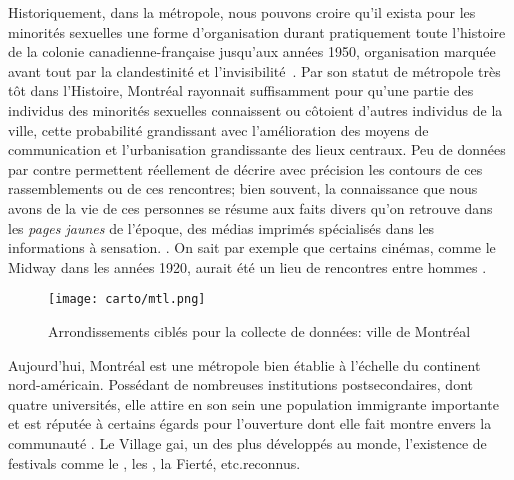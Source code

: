 Historiquement, dans la métropole, nous pouvons croire qu'il exista pour les minorités sexuelles une forme d'organisation durant pratiquement toute l'histoire de la colonie canadienne-française jusqu’aux années 1950, organisation marquée avant tout par la clandestinité et l'invisibilité~\citep{Higgins1999}. 
Par son statut de métropole très tôt dans l'Histoire, Montréal rayonnait suffisamment pour qu'une partie des individus des minorités sexuelles connaissent ou côtoient d'autres individus de la ville, cette probabilité grandissant avec l'amélioration des moyens de communication et l'urbanisation grandissante des lieux centraux. 
Peu de données par contre permettent réellement de décrire avec précision les contours de ces rassemblements ou de ces rencontres; bien souvent, la connaissance que nous avons de la vie de ces personnes se résume aux faits divers qu'on retrouve dans les \emph{pages jaunes} de l'époque, des médias imprimés spécialisés dans les informations à sensation. 
\citep[]{Higgins1999}. 
On sait par exemple que certains cinémas, comme le Midway dans les années 1920, aurait été un lieu de rencontres entre hommes\citep[30]{Higgins1999} .
\begin{figure}[ht]
	\centering
	\texttt{[image: carto/mtl.png]}
	\caption{Arrondissements ciblés pour la collecte de données: ville de
    Montréal}\label{fig:espaces_montreal}
\end{figure}
Aujourd'hui, Montréal est une métropole bien établie à l'échelle du continent nord-américain. 
Possédant de nombreuses institutions postsecondaires, dont quatre universités, elle attire en son sein une population immigrante importante et est réputée à certains égards pour l'ouverture dont elle fait montre envers la communauté \lgbt{}. 
Le Village gai, un des plus développés au monde, l'existence de festivals comme le , les , la Fierté, etc.\@sont reconnus.

